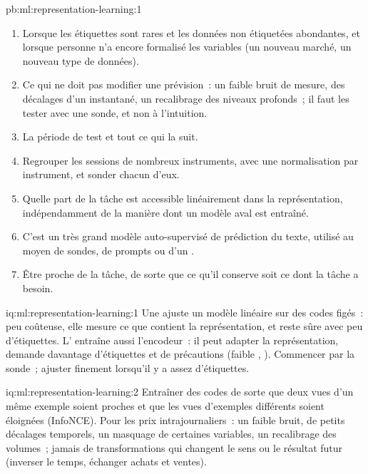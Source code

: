 \begin{solution}{pb:ml:representation-learning:1}
\begin{enumerate}
l'encodeur ajusté finement fait jeu égal avec la régression ridge.
\item Lorsque les étiquettes sont rares et les données non étiquetées abondantes, et lorsque personne n'a encore formalisé les variables (un nouveau marché,
un nouveau type de données).
\item Ce qui ne doit pas modifier une prévision~: un faible bruit de mesure, des décalages d'un instantané, un recalibrage des niveaux profonds~; il faut les tester
avec une sonde, et non à l'intuition.
\item La période de test et tout ce qui la suit.
\item Regrouper les sessions de nombreux instruments, avec une normalisation par instrument, et sonder chacun d'eux.
\item Quelle part de la tâche est accessible linéairement dans la représentation, indépendamment de la manière dont un modèle aval est
entraîné.
\item C'est un très grand modèle auto-supervisé de prédiction du texte, utilisé au moyen de sondes, de prompts ou d'un .
\item Être proche de la tâche, de sorte que ce qu'il conserve soit ce dont la tâche a besoin.
\end{enumerate}
\end{solution}

\begin{solution}{iq:ml:representation-learning:1}
Une  ajuste un modèle linéaire sur des codes figés~: peu coûteuse, elle mesure ce que contient la représentation, et reste sûre avec peu d'étiquettes.
L' entraîne aussi l'encodeur~: il peut adapter la représentation, demande davantage d'étiquettes et de précautions (faible , ). Commencer par la sonde~; ajuster finement lorsqu'il y a assez d'étiquettes.
\end{solution}

\begin{solution}{iq:ml:representation-learning:2}
Entraîner des codes de sorte que deux vues d'un même exemple soient proches et que les vues d'exemples différents soient éloignées (InfoNCE). Pour les prix
intrajournaliers~: un faible bruit, de petits décalages temporels, un masquage de certaines variables, un recalibrage des volumes~; jamais de transformations qui changent
le sens ou le résultat futur (inverser le temps, échanger achats et ventes).
\end{solution}

